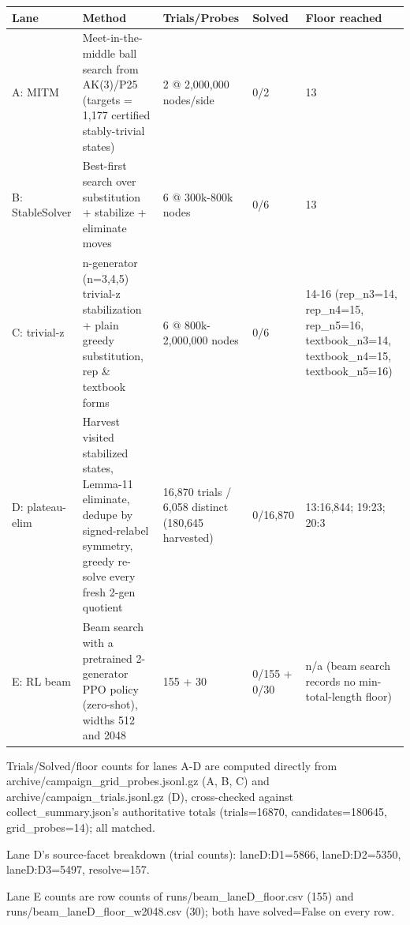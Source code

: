 \begin{tabular}{@{}p{}p{}p{}p{}p{}@{}}
\toprule
Lane & Method & Trials/Probes & Solved & Floor reached \\
\midrule
A: MITM & Meet-in-the-middle ball search from AK(3)/P25 (targets = 1,177 certified stably-trivial states) & 2 @ 2,000,000 nodes/side & 0/2 & 13 \\
B: StableSolver & Best-first search over substitution + stabilize + eliminate moves & 6 @ 300k-800k nodes & 0/6 & 13 \\
C: trivial-z & n-generator (n=3,4,5) trivial-z stabilization + plain greedy substitution, rep \& textbook forms & 6 @ 800k-2,000,000 nodes & 0/6 & 14-16 (rep\_n3=14, rep\_n4=15, rep\_n5=16, textbook\_n3=14, textbook\_n4=15, textbook\_n5=16) \\
D: plateau-elim & Harvest visited stabilized states, Lemma-11 eliminate, dedupe by signed-relabel symmetry, greedy re-solve every fresh 2-gen quotient & 16,870 trials / 6,058 distinct (180,645 harvested) & 0/16,870 & 13:16,844; 19:23; 20:3 \\
E: RL beam & Beam search with a pretrained 2-generator PPO policy (zero-shot), widths 512 and 2048 & 155 + 30 & 0/155 + 0/30 & n/a (beam search records no min-total-length floor) \\
\bottomrule
\end{tabular}

\vspace{2pt}
{\footnotesize
Trials/Solved/floor counts for lanes A-D are computed directly from archive/campaign\_grid\_probes.jsonl.gz (A, B, C) and archive/campaign\_trials.jsonl.gz (D), cross-checked against collect\_summary.json's authoritative totals (trials=16870, candidates=180645, grid\_probes=14); all matched.\par
Lane D's source-facet breakdown (trial counts): laneD:D1=5866, laneD:D2=5350, laneD:D3=5497, resolve=157.\par
Lane E counts are row counts of runs/beam\_laneD\_floor.csv (155) and runs/beam\_laneD\_floor\_w2048.csv (30); both have solved=False on every row.\par
}

